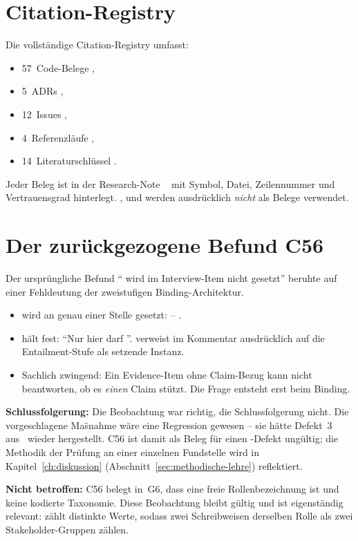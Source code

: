 \section{Citation-Registry}\label{sec:registry}

Die vollst{\"a}ndige Citation-Registry umfasst:

\begin{itemize}
  \item 57~Code-Belege ,
  \item 5~ADRs ,
  \item 12~Issues ,
  \item 4~Referenzl{\"a}ufe ,
  \item 14~Literaturschl{\"u}ssel .
\end{itemize}

Jeder Beleg ist in der Research-Note ~\cite{citation-registry} mit Symbol, Datei, Zeilennummer und Vertrauensgrad hinterlegt. ,  und  werden ausdr{\"u}cklich \emph{nicht} als Belege verwendet.

\section{Der zur{\"u}ckgezogene Befund C56}\label{sec:c56}

Der urspr{\"u}ngliche Befund \enquote{ wird im Interview-Item nicht gesetzt} beruhte auf einer Fehldeutung der zweistufigen Binding-Architektur.

\begin{itemize}
  \item {} wird an genau einer Stelle gesetzt:  -- .
  \item {} h{\"a}lt fest: \enquote{Nur hier darf }.  verweist im Kommentar ausdr{\"u}cklich auf die Entailment-Stufe als setzende Instanz.
  \item Sachlich zwingend: Ein Evidence-Item ohne Claim-Bezug kann nicht beantworten, ob es \emph{einen} Claim st{\"u}tzt. Die Frage entsteht erst beim Binding.
\end{itemize}

\textbf{Schlussfolgerung:} Die Beobachtung war richtig, die Schlussfolgerung nicht. Die vorgeschlagene Ma{\"s}nahme w{\"a}re eine Regression gewesen -- sie h{\"a}tte Defekt~3 aus~\cite{adr-0011} wieder hergestellt. C56 ist damit als Beleg f{\"u}r einen -Defekt ung{\"u}ltig; die Methodik der Pr{\"u}fung an einer einzelnen Fundstelle wird in Kapitel~\ref{ch:diskussion} (Abschnitt~\ref{sec:methodische-lehre}) reflektiert.

\textbf{Nicht betroffen:} C56 belegt in~G6, dass  eine freie Rollenbezeichnung ist und keine kodierte Taxonomie. Diese Beobachtung bleibt g{\"u}ltig und ist eigenst{\"a}ndig relevant:  z{\"a}hlt distinkte Werte, sodass zwei Schreibweisen derselben Rolle als zwei Stakeholder-Gruppen z{\"a}hlen.
